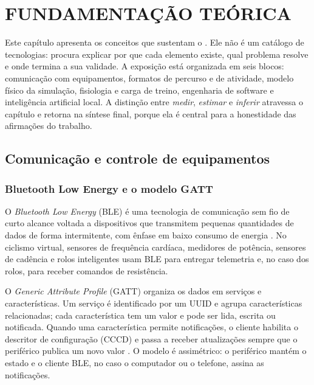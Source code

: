 
\chapter{FUNDAMENTAÇÃO TEÓRICA}
\label{cap:fundamentacao}

Este capítulo apresenta os conceitos que sustentam o \argus{}. Ele não é um
catálogo de tecnologias: procura explicar por que cada elemento existe, qual
problema resolve e onde termina a sua validade. A exposição está organizada em
seis blocos: comunicação com equipamentos, formatos de percurso e de atividade,
modelo físico da simulação, fisiologia e carga de treino, engenharia de
software e inteligência artificial local. A distinção entre \emph{medir},
\emph{estimar} e \emph{inferir} atravessa o capítulo e retorna na síntese final,
porque ela é central para a honestidade das afirmações do trabalho.

\section{Comunicação e controle de equipamentos}
\label{sec:ble-gatt}

\subsection{Bluetooth Low Energy e o modelo GATT}
\label{sec:ble-gatt-modelo}

O \textit{Bluetooth Low Energy} (BLE) é uma tecnologia de comunicação sem fio
de curto alcance voltada a dispositivos que transmitem pequenas quantidades de
dados de forma intermitente, com ênfase em baixo consumo de energia
\cite{bluetoothcore2023}. No ciclismo virtual, sensores de frequência cardíaca,
medidores de potência, sensores de cadência e rolos inteligentes usam BLE para
entregar telemetria e, no caso dos rolos, para receber comandos de resistência.

O \textit{Generic Attribute Profile} (GATT) organiza os dados em serviços e
características. Um serviço é identificado por um UUID e agrupa características
relacionadas; cada característica tem um valor e pode ser lida, escrita ou
notificada. Quando uma característica permite notificações, o cliente habilita
o descritor de configuração (CCCD) e passa a receber atualizações sempre que o
periférico publica um novo valor \cite{bluetoothcore2023}. O modelo é
assimétrico: o periférico mantém o estado e o cliente BLE, no caso o
computador ou o telefone, assina as notificações.

